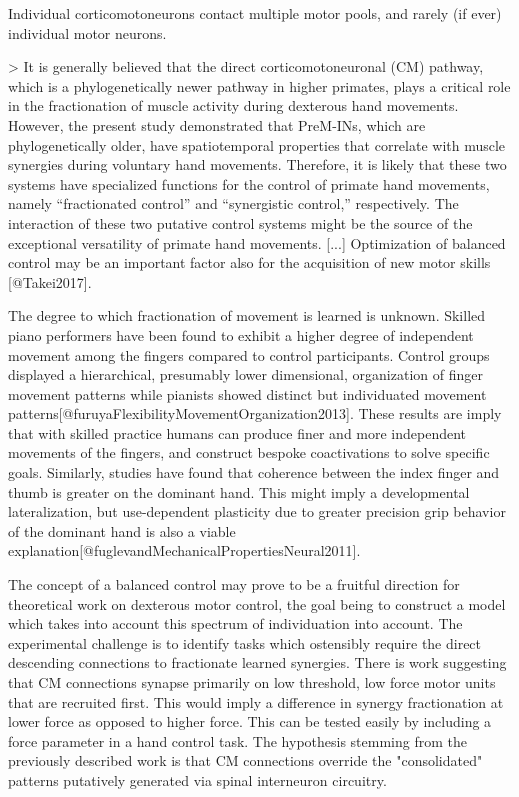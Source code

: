 \documentclass[../main.tex]{subfiles}
\begin{document}
{ Individual corticomotoneurons contact multiple motor pools, and rarely (if ever) individual motor neurons. 

 > It is generally believed that the direct corticomotoneuronal (CM) pathway, which is a phylogenetically newer pathway in higher primates, plays a critical role in the fractionation of muscle activity during dexterous hand movements. However, the present study demonstrated that PreM-INs, which are phylogenetically older, have spatiotemporal properties that correlate with muscle synergies during voluntary hand movements. Therefore, it is likely that these two systems have specialized functions for the control of primate hand movements, namely “fractionated control” and “synergistic control,” respectively. The interaction of these two putative control systems might be the source of the exceptional versatility of primate hand movements. [...] Optimization of balanced control may be an important factor also for the acquisition of new motor skills [@Takei2017]. 

 The degree to which fractionation of movement is learned is unknown. Skilled piano performers have been found to exhibit a higher degree of independent movement among the fingers compared to control participants. Control groups displayed a hierarchical, presumably lower dimensional, organization of finger movement patterns while pianists showed distinct but individuated movement patterns[@furuyaFlexibilityMovementOrganization2013]. These results are imply that with skilled practice humans can produce finer and more independent movements of the fingers, and construct bespoke coactivations to solve specific goals. Similarly, studies have found that coherence between the index finger and thumb is greater on the dominant hand. This might imply a developmental lateralization, but use-dependent plasticity due to greater precision grip behavior of the dominant hand is also a viable explanation[@fuglevandMechanicalPropertiesNeural2011]. 

 The concept of a balanced control may prove to be a fruitful direction for theoretical work on dexterous motor control, the goal being to construct a model which takes into account this spectrum of individuation into account. The experimental challenge is to identify tasks which ostensibly require the direct descending connections to fractionate learned synergies. There is work suggesting that CM connections synapse primarily on low threshold, low force motor units that are recruited first. This would imply a difference in synergy fractionation at lower force as opposed to higher force. This can be tested easily by including a force parameter in a hand control task. The hypothesis stemming from the previously described work is that CM connections override the "consolidated" patterns putatively generated via spinal interneuron circuitry. 


}
\end{document}
